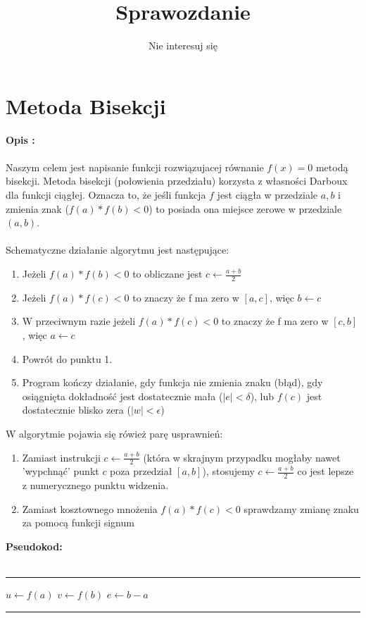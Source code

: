 \documentclass{article}
\author{Nie interesuj się}
\title{\vspace{-2.0cm}Sprawozdanie}
\begin{document}
\maketitle
\section*{Metoda Bisekcji}
\noindent \textbf{Opis : }\\\\
Naszym celem jest napisanie funkcji rozwiązujacej równanie $f(x) =0$ metodą bisekcji. Metoda bisekcji (połowienia przedziału) korzysta z własności Darboux dla funkcji ciągłej. Oznacza to, że jeśli funkcja $f$ jest ciągła w przedziale ${a,b}$ i zmienia znak ($f(a)*f(b) < 0$) to posiada ona miejsce zerowe w przedziale $(a,b)$.\\\\
Schematyczne działanie algorytmu jest następujące: 
\begin{enumerate}
	\item Jeżeli $f(a)*f(b) < 0$ to obliczane jest $c \leftarrow \frac{a+b}{2}$
	\item Jeżeli $f(a)*f(c) < 0$ to znaczy że f ma zero w $[a,c]$, więc $b \leftarrow c$
	\item W przeciwnym razie jeżeli $f(a)*f(c) < 0$ to znaczy że f ma zero w $[c,b]$, więc $a \leftarrow c$
	\item Powrót do punktu 1.
	\item Program kończy działanie, gdy funkcja nie zmienia znaku (błąd), gdy osiągnięta dokładność jest dostatecznie mała ($|e| < \delta$), lub $f(c)$ jest dostatecznie blisko zera ($|w| < \epsilon$)
\end{enumerate}
W algorytmie pojawia się rówież parę usprawnień:
\begin{enumerate}
	\item Zamiast instrukcji $c \leftarrow \frac{a+b}{2}$ (która w skrajnym przypadku mogłaby nawet 'wypchnąć' punkt $c$ poza przedział $[a,b]$), stosujemy $c \leftarrow \frac{a+b}{2}$ co jest lepsze z numerycznego punktu widzenia.
	\item Zamiast kosztownego mnożenia $f(a)*f(c) < 0$ sprawdzamy zmianę znaku za pomocą funkcji signum
\end{enumerate}
\noindent \textbf{Pseudokod: }\\\\  
\rule{\textwidth}{0.4pt}
\begin{algorithm}[H]
	\vspace{0.3cm}
	$u \leftarrow f(a)$\;
	$v \leftarrow f(b)$\;
	$e \leftarrow b- a$\;
		{}
\end{algorithm}
\hrule
\newpage
\end{document}
